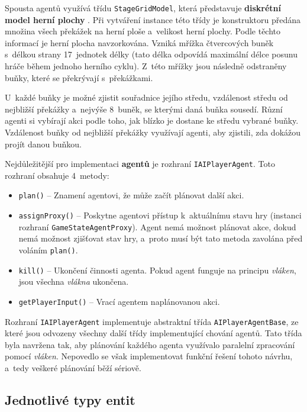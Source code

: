 Spousta agentů využívá třídu \texttt{StageGridModel}, která představuje \textbf{diskrétní model herní plochy} \cite{MIT_OpenCourseWare:Incremental_Path_Planning}. Při vytváření instance této třídy je konstruktoru předána množina všech překážek na herní ploše a~velikost herní plochy. Podle těchto informací je herní plocha navzorkována. Vzniká mřížka čtvercových buněk s~délkou strany 17~jednotek délky (tato délka odpovídá maximální délce posunu hráče během jednoho herního cyklu). Z~této mřížky jsou následně odstraněny buňky, které se překrývají s~překážkami.

U~každé buňky je možné zjistit souřadnice jejího středu, vzdálenost středu od nejbližší překážky a~nejvýše 8~buněk, se kterými daná buňka sousedí. Různí agenti si vybírají akci podle toho, jak blízko je dostane ke středu vybrané buňky. Vzdálenost buňky od nejbližší překážky využívají agenti, aby zjistili, zda dokážou projít danou buňkou.

Nejdůležitější pro implementaci \textbf{agentů} je rozhraní \texttt{IAIPlayerAgent}. Toto rozhraní obsahuje 4~metody:
\begin{itemize}
    \item \texttt{plan()} -- Znamení agentovi, že může začít plánovat další akci.
    \item \texttt{assignProxy()} -- Poskytne agentovi přístup k~aktuálnímu stavu hry (instanci rozhraní \texttt{GameStateAgentProxy}). Agent nemá možnost plánovat akce, dokud nemá možnost zjišťovat stav hry, a~proto musí být tato metoda zavolána před voláním \texttt{plan()}.
    \item \texttt{kill()} -- Ukončení činnosti agenta. Pokud agent funguje na principu \emph{vláken}, jsou všechna \emph{vlákna} ukončena.
    \item \texttt{getPlayerInput()} -- Vrací agentem naplánovanou akci.
\end{itemize}

Rozhraní \texttt{IAIPlayerAgent} implementuje abstraktní třída \texttt{AIPlayerAgentBase}, ze které jsou odvozeny všechny další třídy implementující chování agentů. Tato třída byla navržena tak, aby plánování každého agenta využívalo paralelní zpracování pomocí \emph{vláken}. Nepovedlo se však implementovat funkční řešení tohoto návrhu, a~tedy veškeré plánování běží sériově.


\subsection{Jednotlivé typy entit}

